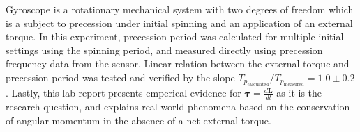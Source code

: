 Gyroscope is a rotationary mechanical system with two degrees of freedom which is a subject to precession under initial spinning and an application of an external torque. In this experiment, precession period was calculated for multiple initial settings using the spinning period, and measured directly using precession frequency data from the sensor. Linear relation between the external torque and precession period was tested and verified by the slope $T_{p_\text{calculated}} / T_{p_\text{measured}} = 1.0 \pm 0.2$. Lastly, this lab report presents emperical evidence for $\boldsymbol\tau = \frac{d\mathbf{L}}{dt}$ as it is the research question, and explains real-world phenomena based on the conservation of angular momentum in the absence of a net external torque.
